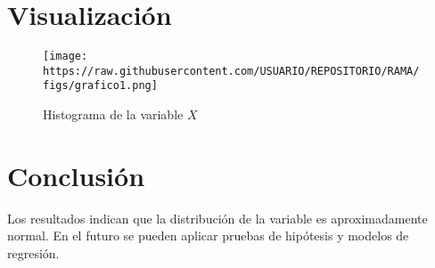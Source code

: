 \documentclass[a4paper,12pt]{article}
\begin{document}
\section{Visualización}

\begin{figure}[h!]
    \centering
    \texttt{[image: https://raw.githubusercontent.com/USUARIO/REPOSITORIO/RAMA/figs/grafico1.png]}
    \caption{Histograma de la variable \( X \)}
    \label{fig:histograma}
\end{figure}

\section{Conclusión}

Los resultados indican que la distribución de la variable es aproximadamente normal. En el futuro se pueden aplicar pruebas de hipótesis y modelos de regresión.
\end{document}
